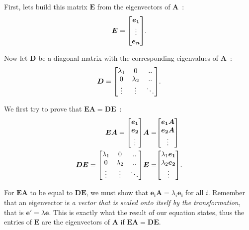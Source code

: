 \documentclass[11pt,twocolumn]{amsart} %
\newcommand{\ve}[1]{\boldsymbol{#1}}
\newcommand{\ma}[1]{\boldsymbol{#1}}
\newenvironment{m}{\begin{bmatrix}}{\end{bmatrix}}
\begin{document}
First, lets build this matrix $\ma{E}$ from the eigenvectors of $\ma{A}$~:
\[
  \ma{E} = \begin{m} \ve{e_1} \\ \vdots \\ \ve{e_n} \end{m}.
\]

Now let $\ma{D}$ be a diagonal matrix with the corresponding eigenvalues of $\ma{A}$~:
\[
  \ma{D} = \begin{m} \lambda_1 & 0 & .. \\ 0 & \lambda_2 & .. \\ \vdots & \vdots & \ddots \end{m}.
\]

We first try to prove that $\ma{E}\ma{A} = \ma{D}\ma{E}$~:
\begin{align*}
  \ma{E}\ma{A} = \begin{m} \ve{e_1} \\ \ve{e_2} \\ \vdots \end{m} \ma{A} = & 
                 \begin{m} \ve{e_1}\ma{A} \\ \ve{e_2}\ma{A} \\ \vdots \end{m} \\
  \ma{D}\ma{E} = \begin{m} \lambda_1 & 0 & .. \\ 0 & \lambda_2 & .. \\ \vdots & \vdots & \ddots \end{m} \ma{E} = & 
                 \begin{m} \lambda_1\ve{e_1} \\ \lambda_2\ve{e_2} \\ \vdots \end{m}.
\end{align*}

For $\ma{E}\ma{A}$ to be equal to $\ma{D}\ma{E}$, we must show that $\ve{e_i}\ma{A} = \lambda_i\ve{e_i}$ for all $i$. Remember that an eigenvector is \emph{a vector that is scaled onto itself by the transformation}, that is $\ve{e'} = \lambda\ve{e}$. This is exactly what the result of our equation states, thus the entries of $\ma{E}$ are the eigenvectors of $\ma{A}$ if $\ma{E}\ma{A} = \ma{D}\ma{E}$.
\end{document}

